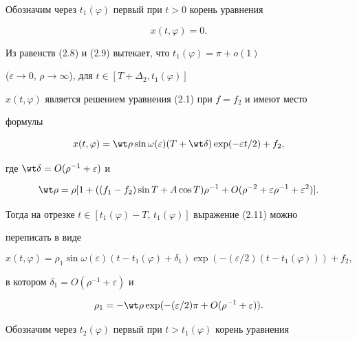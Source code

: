 Обозначим через $t_1(\varphi)$ первый при $t > 0$ корень уравнения


\begin{equation}


x(t,\varphi) = 0.


\end{equation}


Из равенств (2.8) и (2.9) вытекает, что $t_1(\varphi)=\pi+o(1)$


($\varepsilon\to0$, $\rho\to\infty$), для $t\in[T+\Delta_2,t_1(\varphi)]$\;


$x(t,\varphi)$ является решением уравнения (2.1) при $f=f_2$ и имеют место


формулы


\begin{equation}


x(t,\varphi)=\wt\rho\sin\omega(\varepsilon)(T+\wt\delta)\exp(-\varepsilon t/2)


+f_2,


\end{equation}


где $\wt\delta = O(\rho^{-1}+\varepsilon)$ и


\begin{equation}


\wt\rho=\rho[1+((f_1-f_2)\sin T + A\cos T)\rho^{-1}+


O(\rho^{-2}+\varepsilon\rho^{-1}+\varepsilon^2)].


\end{equation}


Тогда на отрезке $t\in[t_1(\varphi)-T,\,t_1(\varphi)]$ выражение (2.11) можно


переписать в виде


\begin{equation}


x(t,\varphi)=\rho_1\sin\omega(\varepsilon)(t-t_1(\varphi)+\delta_1)


\exp(- (\varepsilon/2)(t-t_1(\varphi))) + f_2,


\end{equation}


в котором $\delta_1=O(\rho^{-1}+\varepsilon)$ и


\begin{equation}


\rho_1 = -\wt\rho\exp(-(\varepsilon/2) \pi + O(\rho^{-1}+\varepsilon)).


\end{equation}


Обозначим через $t_2(\varphi)$ первый при $t>t_1(\varphi)$ корень уравнения



